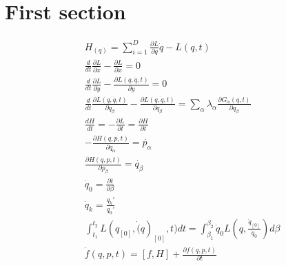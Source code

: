 \documentclass[fleqn,leqno]{article}
\begin{document}
	\section{First section}
	\begin{equation*}
		\begin{split}
			&H_(q)=\sum_{i=1}^{D} \frac{\partial L}{\partial q} \dot{q} - L(q,t) \\
			&\frac{d}{dt} \frac{\partial L}{\partial x}-\frac{\partial L}{\partial x}=0\\
			&\frac{d}{dt} \frac{\partial L}{\partial y}-\frac{\partial L(q,\dot{q},t)}{\partial y}=0\\
			&\frac{d}{dt} \frac{\partial L(q,\dot{q},t)}{\partial q_{\beta}}-\frac{\partial L(q,\dot{q},t)}{\partial q_{\beta}} = \sum_{\alpha}\lambda_{\alpha}\frac{\partial G_{\alpha}(q,t)}{\partial q_{\beta}}\\
			&\frac{dH}{dt} = -\frac{\partial L}{\partial t}=\frac{\partial H}{\partial t}\\
			&-\frac{\partial H(q,p,t)}{\partial q_{\alpha}}=\dot{p_{\alpha}}\\
			&\frac{\partial H(q,p,t)}{\partial p_{\beta}} = \dot{q_{\beta}}\\
			&\dot{q}_{0}=\frac{\partial t}{\partial \beta}\\
			&\dot{q}_{k}=\frac{q_{k}'}{q_{0}'}\\
			&\int_{t_{1}}^{t_{2}} L(q_{[0]},\dot(q)_{[0]},t)dt = \int_{\beta_{1}}^{\beta_{2}}\dot{q}_{0}L(q,\frac{\dot{q}_{[0]}}{\dot{q}_{0}})d\beta\\
			&\dot{f}(q,p,t)=[f,H]+\frac{\partial f(q,p,t)}{\partial t}
		\end{split}
	\end{equation*}
\end{document}
